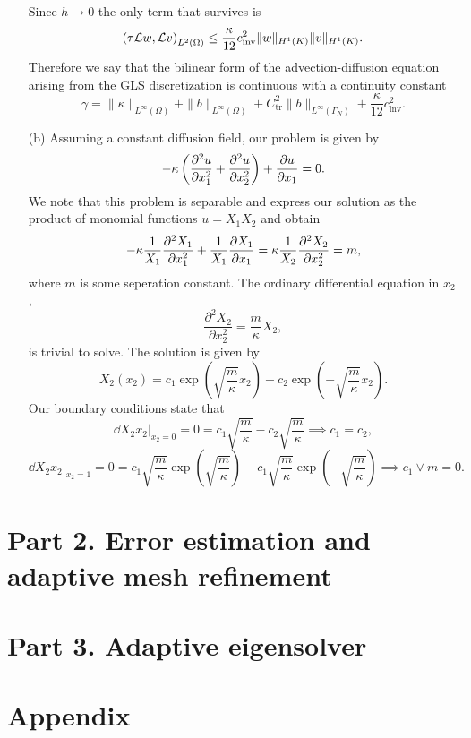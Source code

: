 \documentclass{article}
\begin{document}
\begin{itemize}
	Since \(h \to 0\) the only term that survives is
	\begin{equation*}
		\left(\tau\mathcal{L} w, \mathcal{L} v \right)_{L^2(\Omega)} \leq \frac{\kappa}{12}c_\text{inv}^2 \|w\|_{H^1(K)} \|v\|_{H^1(K)}.
	\end{equation*}
	Therefore we say that the bilinear form of the advection-diffusion equation arising from the GLS discretization is continuous with a continuity constant
	\begin{equation*}
		\gamma = \|\kappa\|_{L^\infty(\Omega)} + \|b\|_{L^\infty(\Omega)} + C^2_\text{tr}\|b\|_{L^\infty(\Gamma_N)} + \frac{\kappa}{12}c_\text{inv}^2.
	\end{equation*}
	
	\item[(b)] Assuming a constant diffusion field, our problem is given by
	\begin{equation*}
		-\kappa\left(\dfrac{\partial^2u}{\partial x_1^2} + \dfrac{\partial^2u}{\partial x_2^2} \right) + \frac{\partial u}{\partial x_1} = 0.
	\end{equation*}
	We note that this problem is separable and express our solution as the product of monomial functions \(u = X_1X_2 \) and obtain
	\begin{equation*}
		-\kappa\dfrac{1}{X_1}\dfrac{\partial^2X_1}{\partial x_1^2} + \dfrac{1}{X_1}\frac{\partial X_1}{\partial x_1} = \kappa \dfrac{1}{X_2}\dfrac{\partial^2X_2}{\partial x_2^2} = m,
	\end{equation*}
	where \(m\) is some seperation constant. The ordinary differential equation in \(x_2 \),
	\begin{equation*}
		\dfrac{\partial^2X_2}{\partial x_2^2} = \dfrac{m}{\kappa}X_2,
	\end{equation*}
	is trivial to solve. The solution is given by
	\begin{equation*}
		X_2(x_2) = c_1\exp\left(\sqrt{\frac{m}{\kappa}}x_2\right) + c_2\exp\left(-\sqrt{\frac{m}{\kappa}}x_2\right).
	\end{equation*}
	Our boundary conditions state that
	\begin{equation*}
		\left.\dd{X_2}{x_2}\right|_{x_2 = 0} = 0 = c_1\sqrt{\dfrac{m}{\kappa}} - c_2\sqrt{\dfrac{m}{\kappa}} \implies c_1 = c_2,
	\end{equation*}
	\begin{equation*}
		\left.\dd{X_2}{x_2}\right|_{x_2 = 1} = 0 = c_1\sqrt{\dfrac{m}{\kappa}}\exp\left(\sqrt{\frac{m}{\kappa}}\right) - c_1\sqrt{\dfrac{m}{\kappa}}\exp\left(-\sqrt{\frac{m}{\kappa}}\right) \implies c_1 \vee m = 0.
	\end{equation*}
\end{itemize}

\section*{Part 2. Error estimation and adaptive mesh refinement}

\section*{Part 3. Adaptive eigensolver}


\section*{Appendix}
\end{document}
